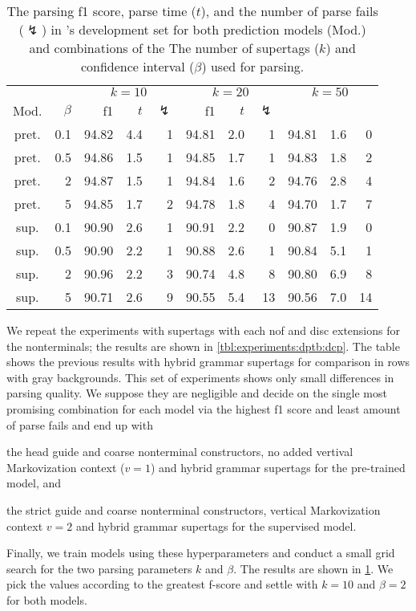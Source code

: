 \documentclass[../../document.tex]{subfiles}
\begin{document}
    \begin{table}
        \caption{\label{tbl:experiments:dptb:k}
        The parsing f1 score, parse time ($t$), and the number of parse fails ($\lightning$) in \dptb{}'s development set for both prediction models (Mod.) and combinations of the The number of supertags ($k$) and confidence interval ($\beta$) used for parsing.
        }
        \centering
        \setlength{\tabcolsep}{4pt}
        \vspace{.2cm}
        \begin{tabular}{cr|rrr|rrr|rrr}
            \toprule
&     &       \multicolumn{3}{c|}{$k = 10$} & \multicolumn{3}{c|}{$k = 20$} & \multicolumn{3}{c}{$k = 50$} \\
Mod. &  $\beta$  & f1 & $t$ & $\lightning$ & f1 & $t$ & $\lightning$ \\ \hline
pret. & 0.1  & 94.82 & 4.4 & 1 & 94.81 & 2.0 & 1 & 94.81 & 1.6 & 0 \\
pret. & 0.5  & 94.86 & 1.5 & 1 & 94.85 & 1.7 & 1 & 94.83 & 1.8 & 2 \\
pret. &   2  & 94.87 & 1.5 & 1 & 94.84 & 1.6 & 2 & 94.76 & 2.8 & 4 \\
pret. &   5  & 94.85 & 1.7 & 2 & 94.78 & 1.8 & 4 & 94.70 & 1.7 & 7 \\
\midrule
sup. & 0.1  & 90.90 & 2.6 & 1 & 90.91 & 2.2 &  0 & 90.87 & 1.9 &  0 \\
sup. & 0.5  & 90.90 & 2.2 & 1 & 90.88 & 2.6 &  1 & 90.84 & 5.1 &  1 \\
sup. &   2  & 90.96 & 2.2 & 3 & 90.74 & 4.8 &  8 & 90.80 & 6.9 &  8 \\
sup. &   5  & 90.71 & 2.6 & 9 & 90.55 & 5.4 & 13 & 90.56 & 7.0 & 14 \\
    \bottomrule
        \end{tabular}
    \end{table}

    We repeat the experiments with  supertags with each nof and disc extensions for the nonterminals; the results are shown in \cref{tbl:experiments:dptb:dcp}.
    The table shows the previous results with hybrid grammar supertags for comparison in rows with gray backgrounds.
    This set of experiments shows only small differences in parsing quality.
    We suppose they are negligible and decide on the single most promising combination for each model via the highest f1 score and least amount of parse fails and end up with
    \begin{compactitem}
        \item the head guide and coarse nonterminal constructors, no added vertival Markovization context ($v=1$) and hybrid grammar supertags for the pre-trained model, and
        \item the strict guide and coarse nonterminal constructors, vertical Markovization context \(v=2\) and hybrid grammar supertags for the supervised model.
    \end{compactitem}
    Finally, we train models using these hyperparameters and conduct a small grid search for the two parsing parameters \(k\) and \(\beta\). The results are shown in \cref{tbl:experiments:dptb:k}.
    We pick the values according to the greatest f-score and settle with \(k=10\) and \(\beta=2\) for both models.
\end{document}

